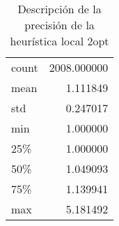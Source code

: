 \begin{table}[H]
    \begin{center}
        \begin{tabular}{| l r |}
            \hline
            count  & 2008.000000 \\
            mean   &    1.111849 \\
            std    &    0.247017 \\
            min    &    1.000000 \\
            25\%   &    1.000000 \\
            50\%   &    1.049093 \\
            75\%   &    1.139941 \\
            max    &    5.181492 \\
            \hline
        \end{tabular}
        \caption{Descripción de la precisión de la heurística local 2opt}\label{tab:precision-big-local-2opt}
    \end{center}
\end{table}

